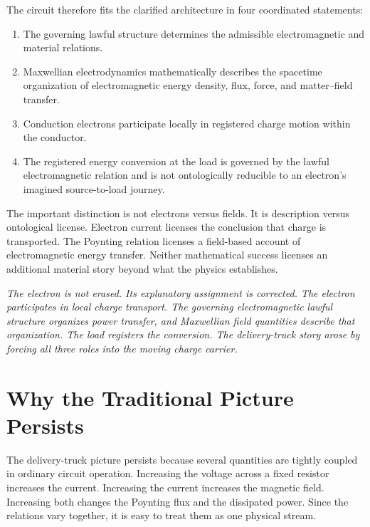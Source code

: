 \documentclass[12pt,onecolumn]{article}
\begin{document}
The circuit therefore fits the clarified architecture in four coordinated statements:

\begin{enumerate}
\item The governing lawful structure determines the admissible electromagnetic and material relations.

\item Maxwellian electrodynamics mathematically describes the spacetime organization of electromagnetic energy density, flux, force, and matter--field transfer.

\item Conduction electrons participate locally in registered charge motion within the conductor.

\item The registered energy conversion at the load is governed by the lawful electromagnetic relation and is not ontologically reducible to an electron's imagined source-to-load journey.
\end{enumerate}

The important distinction is not electrons versus fields. It is description versus ontological license. Electron current licenses the conclusion that charge is transported. The Poynting relation licenses a field-based account of electromagnetic energy transfer. Neither mathematical success licenses an additional material story beyond what the physics establishes.

\begin{mdframed}[linewidth=0.8pt, innertopmargin=10pt, innerbottommargin=10pt, innerrightmargin=14pt, innerleftmargin=14pt, backgroundcolor=gray!15, leftmargin=0.33in, rightmargin=0.33in]
\noindent\textit{The electron is not erased. Its explanatory assignment is corrected. The electron participates in local charge transport. The governing electromagnetic lawful structure organizes power transfer, and Maxwellian field quantities describe that organization. The load registers the conversion. The delivery-truck story arose by forcing all three roles into the moving charge carrier.}
\end{mdframed}


\section{Why the Traditional Picture Persists}

The delivery-truck picture persists because several quantities are tightly coupled in ordinary circuit operation. Increasing the voltage across a fixed resistor increases the current. Increasing the current increases the magnetic field. Increasing both changes the Poynting flux and the dissipated power. Since the relations vary together, it is easy to treat them as one physical stream.
\end{document}
